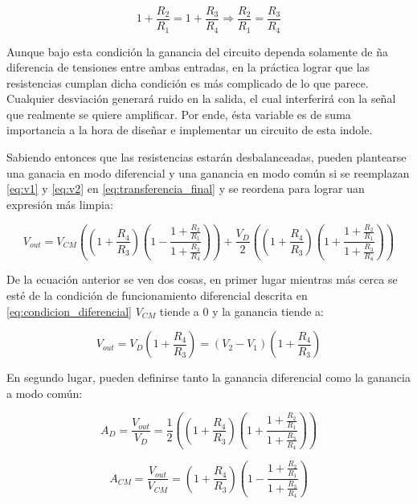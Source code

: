 \documentclass[a4paper]{article}
\begin{document}
\begin{equation}\label{eq:condicion_diferencial}
1 + \frac{R_2}{R_1} = 1 + \frac{R_3}{R_4} \Rightarrow \boxed{\frac{R_2}{R_1} = \frac{R_3}{R_4}}
\end{equation}

Aunque bajo esta condición la ganancia del circuito dependa solamente de ña diferencia de tensiones entre ambas entradas, en la práctica lograr que las resistencias cumplan dicha condición es más complicado de lo que parece. Cualquier desviación generará ruido en la salida, el cual interferirá con la señal que realmente se quiere amplificar. Por ende, ésta variable es de suma importancia a la hora de diseñar e implementar un circuito de esta indole. 

Sabiendo entonces que las resistencias estarán desbalanceadas, pueden plantearse una ganacia en modo diferencial y una ganancia en modo común si se reemplazan \ref{eq:v1} y \ref{eq:v2} en \ref{eq:transferencia_final} y se reordena para lograr uan expresión más limpia:

\begin{equation}\label{eq:ganancias_no_ideales}
V_{out} = V_{CM}((1 + \frac{R_4}{R_3})(1 - \frac{1 + \frac{R_2}{R_1}}{1 + \frac{R_3}{R_4}})) + \frac{V_D}{2}((1 + \frac{R_4}{R_3})(1 + \frac{1 + \frac{R_2}{R_1}}{1 + \frac{R_3}{R_4}}))
\end{equation}

De la ecuación anterior se ven dos cosas, en primer lugar mientras más cerca se esté de la condición de funcionamiento diferencial descrita en \ref{eq:condicion_diferencial} $V_{CM}$ tiende a 0 y la ganancia tiende a:

\begin{equation}\label{ganancia_diferencial_ideal}
\boxed{V_{out} = V_D(1 + \frac{R_4}{R_3}) = (V_2 - V_1)(1 + \frac{R_4}{R_3})}
\end{equation}


En segundo lugar, pueden definirse tanto la ganancia diferencial como la ganancia a modo común:

\begin{equation}\label{eq:ganancia_diferencial}
A_D = \frac{V_{out}}{V_D} = \frac{1}{2}((1 + \frac{R_4}{R_3})(1 + \frac{1 + \frac{R_2}{R_1}}{1 + \frac{R_3}{R_4}}))
\end{equation}

\begin{equation}\label{eq:ganancia_comun}
A_{CM} = \frac{V_{out}}{V_{CM}} = (1 + \frac{R_4}{R_3})(1 - \frac{1 + \frac{R_2}{R_1}}{1 + \frac{R_3}{R_4}})
\end{equation}
\end{document}
